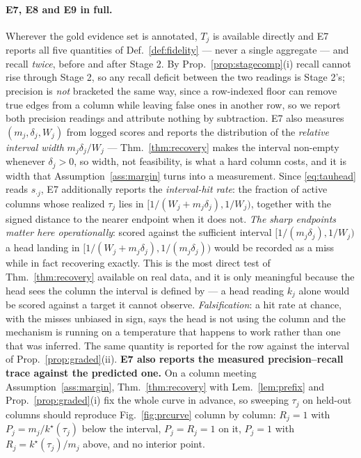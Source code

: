 \documentclass{article}
\begin{document}
\paragraph{E7, E8 and E9 in full.} Wherever the gold evidence set is
annotated, $T_j$ is available directly and E7 reports all five quantities of
Def.~\ref{def:fidelity} --- never a single aggregate --- and recall \emph{twice}, before and
after Stage 2. By Prop.~\ref{prop:stagecomp}(i) recall cannot rise through Stage 2, so any
recall deficit between the two readings is Stage 2's; precision is \emph{not} bracketed the same
way, since a row-indexed floor can remove true edges from a column while leaving false ones in
another row, so we report both precision readings and attribute nothing by subtraction. E7 also
measures $(m_j,\delta_j,W_j)$ from logged scores and reports the distribution of the
\emph{relative interval width} $m_j\delta_j/W_j$ --- Thm.~\ref{thm:recovery} makes the interval
non-empty whenever $\delta_j>0$, so width, not feasibility, is what a hard column costs, and it
is width that Assumption~\ref{ass:margin} turns into a measurement. Since \eqref{eq:tauhead}
reads $s_{\cdot j}$, E7 additionally reports the
\emph{interval-hit rate}: the fraction of active columns whose realized $\tau_j$ lies in
$[1/(W_j+m_j\delta_j),1/W_j)$, together with the signed distance to the nearer endpoint when it
does not. \emph{The sharp endpoints matter here operationally}: scored against the sufficient
interval $[1/(m_j\delta_j),1/W_j)$ a head landing in $[1/(W_j+m_j\delta_j),1/(m_j\delta_j))$
would be recorded as a miss while in fact recovering exactly. This is the most direct test of
Thm.~\ref{thm:recovery} available on real data, and it is
only meaningful because the head sees the column the interval is defined by --- a head reading
$k_j$ alone would be scored against a target it cannot observe. \emph{Falsification}: a hit rate
at chance, with the misses unbiased in sign, says the head is not using the column and the
mechanism is running on a temperature that happens to work rather than one that was inferred.
The same quantity is reported for the row against the interval of
Prop.~\ref{prop:graded}(ii). \textbf{E7 also reports the measured precision--recall trace against
the predicted one.} On a column meeting Assumption~\ref{ass:margin},
Thm.~\ref{thm:recovery} with Lem.~\ref{lem:prefix} and Prop.~\ref{prop:graded}(i) fix the whole
curve in advance, so sweeping $\tau_j$ on held-out columns should reproduce
Fig.~\ref{fig:prcurve} column by column: $R_j=1$ with $P_j=m_j/k^\star(\tau_j)$ below the
interval, $P_j=R_j=1$ on it, $P_j=1$ with $R_j=k^\star(\tau_j)/m_j$ above, and no interior point.
\end{document}
